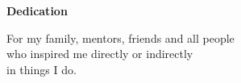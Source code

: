 
\newpage
\vspace*{0.9cm}
\begin{center}
{\bf \Huge Dedication}
\end{center}


\setlength{\baselineskip}{0.8cm}

{}

\newenvironment{dedication}
  {%
   \vspace*{\stretch{1}}%
   \itshape             %
   \raggedleft          %
  }
  {\par %
   \vspace{\stretch{3}} %
   \clearpage           %
  }

\begin{dedication}
	\begin{adjustwidth}{8em}{8em}
		\begin{center}
			For my family, mentors, friends and all people \\
			who inspired me directly or indirectly \\
			in things I do.
		\end{center}
	\end{adjustwidth}
\end{dedication}


